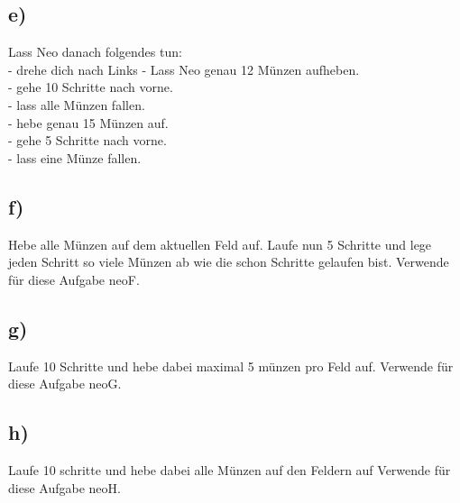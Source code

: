 \subsection*{e)}
Lass Neo danach folgendes tun:\\
- drehe dich nach Links
- Lass Neo genau 12 Münzen aufheben. \\
- gehe 10 Schritte nach vorne.\\
- lass alle Münzen fallen.\\
- hebe genau 15 Münzen auf.\\
- gehe 5 Schritte nach vorne.\\
- lass eine Münze fallen.

\subsection*{f)}
Hebe alle Münzen auf dem aktuellen Feld auf. Laufe nun 5 Schritte und lege jeden Schritt so viele Münzen ab wie die schon Schritte gelaufen bist. Verwende für diese Aufgabe neoF.

\subsection*{g)}
 Laufe 10 Schritte und hebe dabei maximal 5 münzen pro Feld auf. Verwende für diese Aufgabe neoG.

\subsection*{h)}
Laufe 10 schritte und hebe dabei alle Münzen auf den Feldern auf Verwende für diese Aufgabe neoH.
\newpage
